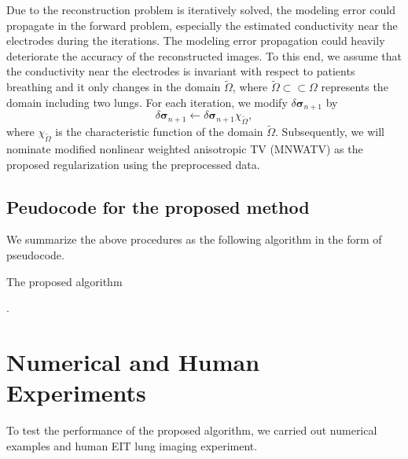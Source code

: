 \documentclass[lettersize,journal]{IEEEtran}
\def\Om{\Omega}
\begin{document}
Due to the reconstruction problem is iteratively solved, the modeling error could propagate in the forward problem, especially the estimated conductivity near the electrodes during the iterations.
The modeling error propagation could heavily deteriorate the accuracy of the reconstructed images.
To this end, we assume that the conductivity near the electrodes is invariant with respect to patients breathing and it only changes in the domain $\widetilde \Om$, where $\widetilde \Om \subset\subset \Om$ represents the domain including two lungs. For each iteration, we modify $\delta{\bm\sigma}_{n+1}$ by
\begin{equation}\label{modify_result}
\delta {\bm \sigma}_{n+1} \leftarrow \delta {\bm \sigma}_{n+1}\chi_{\widetilde \Om},
\end{equation}
where $\chi_{\widetilde \Om}$ is the characteristic function of the domain $\widetilde \Om$. Subsequently, we will nominate modified nonlinear weighted anisotropic TV (MNWATV) as the proposed regularization using the preprocessed data.

\subsection{Peudocode for the proposed method}
We summarize the above procedures as the following algorithm in the form of pseudocode.

\begin{algorithm}[h]
  \caption{The proposed algorithm }
  \label{The proposed algorithm}
  \begin{algorithmic}[1]
    \STATE {Update $\bm{\sigma}_{n+1}$ using \eqref{a51} and set $\bm{\sigma}_{n+1} \leftarrow \bm{\sigma}_{n+1}\chi_{\widetilde \Om}$}.
      \ENDIF
    \ENDWHILE
  \end{algorithmic}
\end{algorithm}

\section{Numerical and Human Experiments}\label{experiments}
To test the performance of the proposed algorithm, we carried out numerical examples and human EIT lung imaging experiment.
\end{document}
